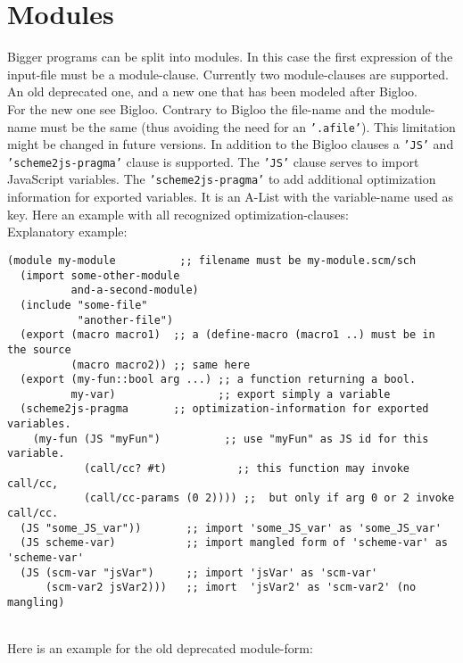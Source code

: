 \section{Modules}
Bigger programs can be split into modules. In this case the first expression
of the input-file must be a module-clause. Currently two
module-clauses are supported. An old deprecated one, and a new one that has
been modeled after Bigloo.\\
For the new one see Bigloo. Contrary to Bigloo the file-name and the
module-name must be the same (thus avoiding the need for an \texttt{'.afile'}).
This limitation might be changed in future versions. In addition to the Bigloo
clauses a \texttt{'JS'} and \texttt{'scheme2js-pragma'} clause is supported. The
\texttt{'JS'} clause serves to import JavaScript variables. The
\texttt{'scheme2js-pragma'} to add
additional optimization information for exported variables. It
is an A-List with the variable-name used as
key. Here an example with all recognized optimization-clauses:\\
Explanatory example:\\
\begin{verbatim}
(module my-module          ;; filename must be my-module.scm/sch
  (import some-other-module
          and-a-second-module)
  (include "some-file"
           "another-file")
  (export (macro macro1)  ;; a (define-macro (macro1 ..) must be in the source
          (macro macro2)) ;; same here
  (export (my-fun::bool arg ...) ;; a function returning a bool.
          my-var)                ;; export simply a variable
  (scheme2js-pragma       ;; optimization-information for exported variables.
    (my-fun (JS "myFun")          ;; use "myFun" as JS id for this variable.
            (call/cc? #t)           ;; this function may invoke call/cc,
            (call/cc-params (0 2)))) ;;  but only if arg 0 or 2 invoke call/cc.
  (JS "some_JS_var"))       ;; import 'some_JS_var' as 'some_JS_var'
  (JS scheme-var)           ;; import mangled form of 'scheme-var' as 'scheme-var'
  (JS (scm-var "jsVar")     ;; import 'jsVar' as 'scm-var'
      (scm-var2 jsVar2)))   ;; imort  'jsVar2' as 'scm-var2' (no mangling)
\end{verbatim}\\
Here is an example for the old deprecated module-form:\\
